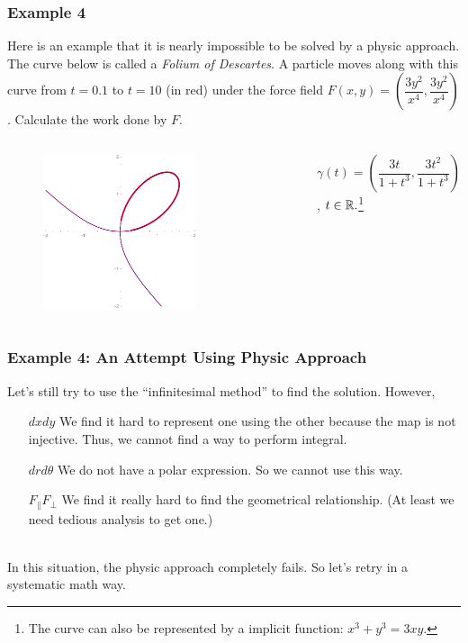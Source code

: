 \documentclass[11pt, t]{beamer}
\newcommand{\nullspace}{~\\[15pt]}
\begin{document}
\begin{frame}
    \frametitle{Example 4}
    Here is an example that it is nearly impossible to be solved by a physic approach. The curve below is called a \textit{Folium of Descartes}. A particle moves along with this curve from $t=0.1$ to $t=10$ (in red) under the force field $F(x,y)=(\dfrac{3y^2}{x^4},\dfrac{3y^2}{x^4})$. Calculate the work done by $F$.
    \begin{columns}
        \begin{figure}[H]
            \centering
            \includegraphics[width=0.7\textwidth]{c2.pdf}
        \end{figure}
        \vspace{1.5cm}

        $\gamma(t)=(\dfrac{3t}{1+t^3},\dfrac{3t^2}{1+t^3})$, $t\in\mathbb{R}.$\footnote[frame]{The curve can also be represented by a implicit function: $ x^3 + y^3 = 3xy.$}\\
    \end{columns}

\end{frame}

\begin{frame}
    \frametitle{Example 4: An Attempt Using Physic Approach}
    Let's still try to use the ``infinitesimal method'' to find the solution. However,  \nullspace
    \begin{itemize}
        \item[$dxdy$] We find it hard to represent one using the other because the map is not injective. Thus, we cannot find a way to perform integral.
        \item[$drd\theta$] We do not have a polar expression. So we cannot use this way.
        \item[$F_\parallel F_\perp$] We find it really hard to find the geometrical relationship. (At least we need tedious analysis to get one.)
    \end{itemize}
    \nullspace
    In this situation, the physic approach completely fails. So let's retry in a systematic math way.
\end{frame}
\end{document}
